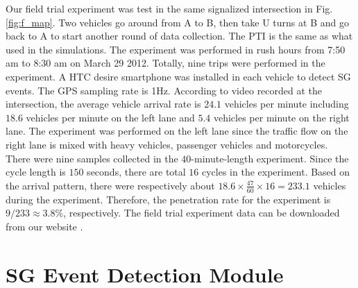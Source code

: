 \documentclass[final,oneside,onecolumn,12pt,a4paper]{book}%
\begin{document}
Our field trial experiment was test in the same signalized intersection in
Fig. \ref{fig:f_map}. Two vehicles go around from A to B, then take U turns at
B and go back to A to start another round of data collection. The PTI is the
same as what used in the simulations. The experiment was performed in rush
hours from 7:50 am to 8:30 am on March 29 2012. Totally, nine trips were
performed in the experiment. A HTC desire smartphone was installed in each
vehicle to detect SG events. The GPS sampling rate is
1Hz.
According to video recorded at the intersection, the average vehicle arrival
rate is $24.1$ vehicles per minute including $18.6$ vehicles per minute on the
left lane and $5.4$ vehicles per minute on the right lane. The experiment was
performed on the left lane since the traffic flow on the right lane is mixed
with heavy vehicles, passenger vehicles and motorcycles. There were nine
samples collected in the $40$-minute-length experiment. Since the cycle length
is $150$ seconds, there are total $16$ cycles in the experiment. Based on the
arrival pattern, there were respectively about $18.6\times\frac{47}{60}%
\times16=233.1$ vehicles during the experiment. Therefore, the penetration
rate for the experiment is $9/233\approx3.8\%$, respectively. The field trial
experiment data can be downloaded from our website \cite{Nol2012Field}.

\section{SG Event Detection Module}
\end{document}
